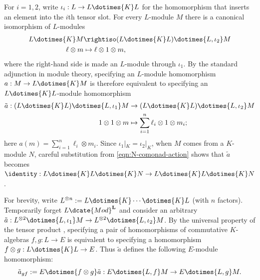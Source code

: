 For $i=1,2$, write $\iota_i:L\to L\dotimes{K}L$ for the homomorphism that
inserts an element into the $i$th tensor slot. For every $L$-module $M$ there
is a canonical isomorphism of $L$-modules
\begin{align*}
	L \dotimes{K} M & \rightiso (L \dotimes{K} L) \dotimes{L, \iota_2} M \\
	\ell \otimes m & \mapsto \ell \otimes 1 \otimes m,
\end{align*}
where the right-hand side is made an $L$-module through $\iota_1$. By the
standard adjunction in module theory, specifying an $L$-module homomorphism
$a:M\to L\dotimes{K}M$ is therefore equivalent to specifying an
$L\dotimes{K}L$-module homomorphism
\begin{equation}\label{eqn:flat-descent-map-aux}\begin{aligned}
		\tilde{a}: (L \dotimes{K} L) \dotimes{L, \iota_1} M & \to (L \dotimes{K} L) \dotimes{L, \iota_2} M \\
		1 \otimes 1 \otimes m & \mapsto \sum_{i=1}^n \ell_i \otimes 1 \otimes m_i ;
\end{aligned}\end{equation}
here $a(m)=\sum_{i=1}^n\ell_i\otimes m_i$. Since
$\iota_1|_K=\iota_2|_K$, when $M$ comes from a $K$-module $N$, careful
substitution from \eqref{eqn:N-comonad-action} shows that $\tilde a$ becomes
$\identity:L\dotimes{K}L\dotimes{K}N\to
L\dotimes{K}L\dotimes{K}N$.

For brevity, write $L^{\otimes n}:=L\dotimes{K}\cdots\dotimes{K}L$ (with
$n$ factors). Temporarily forget $L\dcate{Mod}^{\mathbf{L}}$ and consider
an arbitrary
$\tilde a:L^{\otimes2}\dotimes{L,\iota_1}M\to
L^{\otimes2}\dotimes{L,\iota_2}M$. By the universal property of the tensor
product \cite[Proposition 7.3.4]{Li1}, specifying a pair of homomorphisms of
commutative $K$-algebras $f,g:L\to E$ is equivalent to specifying a
homomorphism $f\otimes g:L\dotimes{K}L\to E$. Thus $\tilde a$ defines the
following $E$-module homomorphism:
\begin{equation*}
	\tilde{a}_{gf} := E \dotimes{f \otimes g} \tilde{a}: E \dotimes{L, f} M \to E \dotimes{L, g} M.
\end{equation*}


